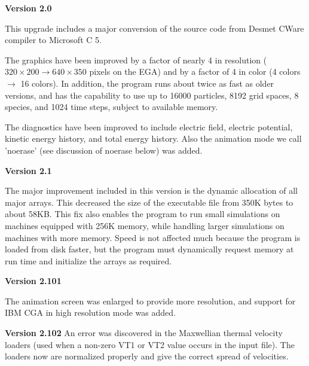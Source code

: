 \begin{section}
\begin{subsection}
\begin{subsubsection}
{\bf Version 2.0}

      This upgrade includes a major conversion of the source code from Desmet
      CWare compiler to Microsoft C 5.
\vspace{.2in}

\noindent
      The graphics have been improved by a factor of nearly 4 in resolution
      ($320\times200 \rightarrow 640\times350$ pixels on the EGA) 
      and by a factor of 4 
      in color (4 colors $\rightarrow$ 16 colors). In addition, the
      program runs about twice as fast
      as older versions, and has the capability to use up to 16000 particles,
      8192 grid spaces, 8 species, and 1024 time steps, subject to available
      memory.
\vspace{.2in}

\noindent
      The diagnostics have been improved to include electric field, electric
      potential, kinetic energy history, and total energy history.  Also the
      animation mode we call 'noerase' (see discussion of noerase below) was
      added.
\end{subsubsection}

\begin{subsubsection}
{\bf Version 2.1}

      The major improvement included in this version is the dynamic allocation
      of all major arrays.  This decreased the size of the executable file from
      350K bytes to about 58KB.  This fix also enables the program to run small
      simulations on machines equipped with 256K memory, while handling larger
      simulations on machines with more memory.  Speed is not affected much
      because the program is loaded from disk faster, but the program must
      dynamically request memory at run time and initialize the arrays as
      required.
\end{subsubsection}

\begin{subsubsection}
{\bf Version 2.101}

      The animation screen was enlarged to provide more resolution, and support
      for IBM CGA in high resolution mode was added.
\end{subsubsection}

\begin{subsubsection}
{\bf Version 2.102}
      An error was discovered in the Maxwellian thermal velocity loaders (used
      when a non-zero VT1 or VT2 value occurs in the input file).  The loaders
      now are normalized properly and give the correct spread of velocities.
\end{subsubsection}


\end{subsection}
\end{section}
